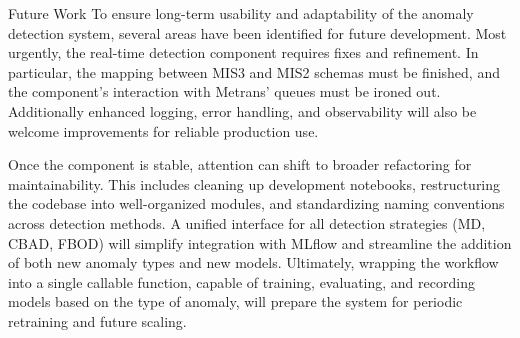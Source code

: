 

\sec Future Work
To ensure long-term usability and adaptability of the anomaly detection system, several areas have been identified for future development. Most urgently, the real-time detection component requires fixes and refinement. In particular, the mapping between MIS3 and MIS2 schemas must be finished, and the component's interaction with Metrans' queues must be ironed out. Additionally enhanced logging, error handling, and observability will also be welcome improvements for reliable production use.

Once the component is stable, attention can shift to broader refactoring for maintainability. This includes cleaning up development notebooks, restructuring the codebase into well-organized modules, and standardizing naming conventions across detection methods. A unified interface for all detection strategies (MD, CBAD, FBOD) will simplify integration with MLflow and streamline the addition of both new anomaly types and new models. Ultimately, wrapping the workflow into a single callable function, capable of training, evaluating, and recording models based on the type of anomaly, will prepare the system for periodic retraining and future scaling.
